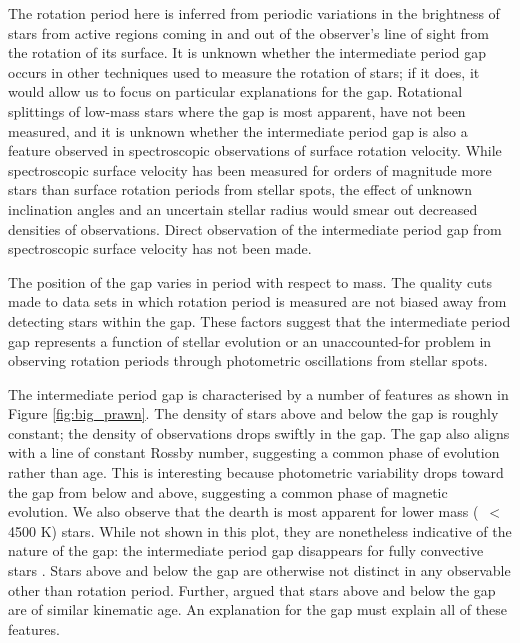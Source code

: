 The rotation period here is inferred from periodic variations in the brightness of stars from active regions coming in and out of the observer's line of sight from the rotation of its surface.
It is unknown whether the intermediate period gap occurs in other techniques used to measure the rotation of stars; if it does, it would allow us to focus on particular explanations for the gap.
Rotational splittings of low-mass stars where the gap is most apparent, have not been measured, and it is unknown whether the intermediate period gap is also a feature observed in spectroscopic observations of surface rotation velocity.
While spectroscopic surface velocity has been measured for orders of magnitude more stars than surface rotation periods from stellar spots, the effect of unknown inclination angles and an uncertain stellar radius would smear out decreased densities of observations.
Direct observation of the intermediate period gap from spectroscopic surface velocity has not been made.

The position of the gap varies in period with respect to mass. 
The quality cuts made to data sets in which rotation period is measured \citep[e.g., removing binaries and subgiants as in the analysis of ][]{mcquillan_rotation_2014, claytor_tess_2023} are not biased away from detecting stars within the gap.
These factors suggest that the intermediate period gap represents a function of stellar evolution or an unaccounted-for problem in observing rotation periods through photometric oscillations from stellar spots.

The intermediate period gap is characterised by a number of features as shown in Figure \ref{fig:big_prawn}.
The density of stars above and below the gap is roughly constant; the density of observations drops swiftly in the gap.
The gap also aligns with a line of constant Rossby number, suggesting a common phase of evolution rather than age.
This is interesting because photometric variability drops toward the gap from below and above, suggesting a common phase of magnetic evolution.
We also observe that the dearth is most apparent for lower mass (\teff\ $<$ 4500 K) stars.
While not shown in this plot, they are nonetheless indicative of the nature of the gap: the intermediate period gap disappears for fully convective stars \citep{lu_bridging_2022}.
Stars above and below the gap are otherwise not distinct in any observable other than rotation period.
Further, \citet{lu_bridging_2022} argued that stars above and below the gap are of similar kinematic age.
An explanation for the gap must explain all of these features.

